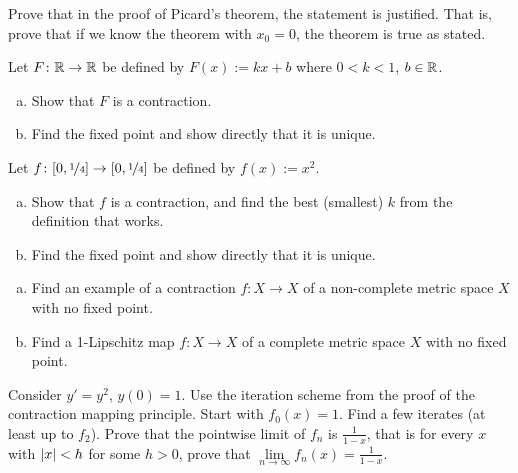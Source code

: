 \begin{exercise}
Prove that in the proof of Picard's theorem,
the statement  is
justified.  That is, prove that if we know the theorem with $x_0 = 0$, the
theorem is true as stated.
\end{exercise}


\begin{exercise}
Let $F \colon {\mathbb{R}} \to {\mathbb{R}}$ be defined by
$F(x) := kx + b$ where $0 < k < 1$, $b \in {\mathbb{R}}$.
\begin{enumerate}[a)]
\item
Show that $F$ is a contraction.
\item
Find the fixed point and show directly that it is unique.
\end{enumerate}
\end{exercise}

\begin{exercise}
Let $f \colon [0,\nicefrac{1}{4}] \to [0,\nicefrac{1}{4}]$ be defined by
$f(x) := x^2$.
\begin{enumerate}[a)]
\item
Show that $f$
is a contraction, and find the best (smallest) $k$ from the definition that works.
\item
Find the fixed point and show directly that it is unique.
\end{enumerate}
\end{exercise}

\begin{samepage}
\begin{exercise} \label{exercise:nofixedpoint}
\leavevmode
\begin{enumerate}[a)]
\item
Find an example of a contraction $f \colon X \to X$
of a non-complete metric space $X$ with no
fixed point.
\item
Find a 1-Lipschitz map $f \colon X \to X$ of a complete metric space $X$ with no fixed point.
\end{enumerate}
\end{exercise}
\end{samepage}

\begin{exercise}
Consider $y' =y^2$, $y(0)=1$.  Use the iteration scheme
from the proof of the contraction mapping principle.
Start with $f_0(x) = 1$.  Find a 
few iterates (at least up to $f_2$).  Prove that
the pointwise limit of $f_n$ is $\frac{1}{1-x}$, that is for every $x$
with $\left\lvert {x} \right\rvert < h$ for some $h > 0$,
prove that $\lim\limits_{n\to\infty}f_n(x) = \frac{1}{1-x}$.
\end{exercise}

